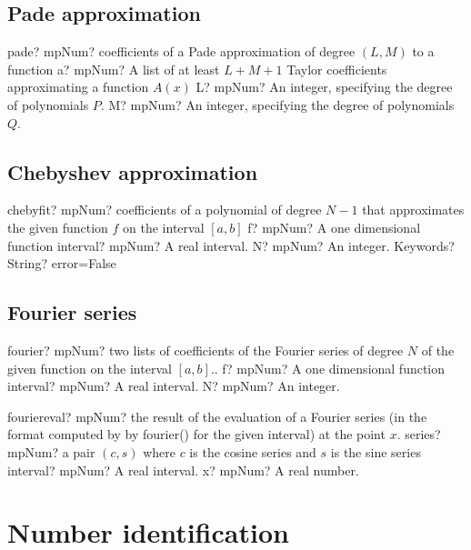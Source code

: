 \documentclass[12pt,a4paper,openany]{book}
\begin{document}
\section{Pade approximation}

\begin{mpFunctionsExtract}
\mpFunctionThree
{pade? mpNum? coefficients of a Pade approximation of degree $(L,M)$ to a function}
{a? mpNum? A list of at least $L+M+1$ Taylor coefficients approximating a function $A(x)$ }
{L? mpNum? An integer, specifying the degree of polynomials $P$.}
{M? mpNum? An integer, specifying the degree of polynomials $Q$.}
\end{mpFunctionsExtract}

\section{Chebyshev approximation}

\begin{mpFunctionsExtract}
\mpFunctionFour
{chebyfit? mpNum? coefficients of a polynomial of degree $N-1$ that approximates the given function $f$ on the interval $[a,b]$}
{f? mpNum? A one dimensional function}
{interval? mpNum? A real interval.}
{N? mpNum? An integer.}
{Keywords? String? error=False}
\end{mpFunctionsExtract}

\section{Fourier series}

\begin{mpFunctionsExtract}
\mpFunctionThree
{fourier? mpNum? two lists of coefficients of the Fourier series of degree $N$ of the given function on the interval $[a,b]$..}
{f? mpNum? A one dimensional function}
{interval? mpNum? A real interval.}
{N? mpNum? An integer.}
\end{mpFunctionsExtract}

\begin{mpFunctionsExtract}
\mpFunctionThree
{fouriereval? mpNum? the result of the evaluation of a Fourier series (in the format computed by by fourier() for the given interval) at the point $x$.}
{series? mpNum? a pair $(c,s)$ where $c$ is the cosine series and $s$ is the sine series}
{interval? mpNum? A real interval.}
{x? mpNum? A real number.}
\end{mpFunctionsExtract}

\chapter{Number identification}
\end{document}

